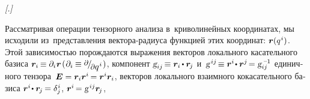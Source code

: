 \begin{otherlanguage}{russian}

\begin{changemargin}{\parindent}{\parindent}
{\small
\noindent \emph{[.]}
\par}
\end{changemargin}

\noindent Рассматривая операции тензорного анализа в~криволинейных координатах, мы исходили из~представления вектора\hbox{-}радиуса функцией этих координат: ${\bm{r}(q^{\hspace{.1ex}i})}$. Этой зависимостью порождаются выражения
векторов локального касательного \hbox{базиса} ${\bm{r}_i \hspace{-0.16ex} \equiv \partial_i \hspace{.12ex} \bm{r}}$\:${( \hspace{.12ex} \partial_i \hspace{-0.1ex} \equiv \smash{\raisemath{0.16em}{\scalebox{0.88}{$\partial$}} \hspace{-0.24ex} / \hspace{-0.32ex} \raisemath{-0.32em}{\scalebox{0.88}{$\partial$} q^{\hspace{.1ex}i}}} \hspace{.16ex} )}$,
компонент ${\textsl{g}_{ij} \hspace{-0.24ex} \equiv \bm{r}_i \hspace{-0.16ex} \dotp \bm{r}_{\hspace{-0.2ex}j}}$ и~${\textsl{g}^{\hspace{.25ex}ij} \hspace{-0.32ex} \equiv \bm{r}^i \hspace{-0.32ex} \dotp \bm{r}^j \hspace{-0.32ex} = \smash{\textsl{g}_{ij}^{\hspace{.4ex}\expminusone}}}$ единичного  тензора~${\bm{E} = \bm{r}_i \bm{r}^i \hspace{-0.2ex} = \bm{r}^i \bm{r}_i}$,
векторов локального взаимного кокасательного \hbox{базиса} ${\bm{r}^i \hspace{-0.32ex} \dotp \bm{r}_{\hspace{-0.2ex}j} \hspace{-0.16ex} = \delta_j^{\hspace{0.1ex}i}}$, ${\bm{r}^i \hspace{-0.25ex} = \textsl{g}^{\hspace{.25ex}ij} \bm{r}_{\hspace{-0.2ex}j}}$,

\end{otherlanguage}
